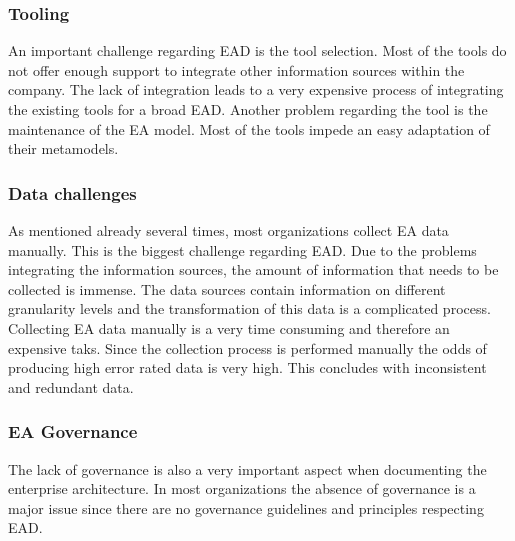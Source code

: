 \subsubsection{Tooling}
An important challenge regarding EAD is the tool selection. Most of the tools do not offer enough support to integrate other information sources within the company. The lack of integration leads to a very expensive process of integrating the existing tools for a broad EAD.
Another problem regarding the tool is the maintenance of the EA model. Most of the tools impede an easy adaptation of their metamodels.

\subsubsection{Data challenges}
As mentioned already several times, most organizations collect EA data manually. This is the biggest challenge regarding EAD. Due to the problems integrating the information sources, the amount of information that needs to be collected is immense. The data sources contain information on different granularity levels and the transformation of this data is a complicated process.
Collecting EA data manually is a very time consuming and therefore an expensive taks. Since the collection process is performed manually the odds of producing high error rated data is very high. This concludes with inconsistent and redundant data.

\subsubsection{EA Governance}
The lack of governance is also a very important aspect when documenting the enterprise architecture. In most organizations the absence of governance is a major issue since there are no governance guidelines and principles respecting EAD.




